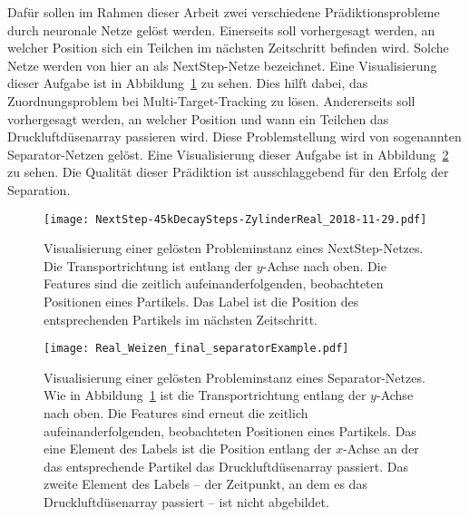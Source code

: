 Dafür sollen im Rahmen dieser Arbeit zwei verschiedene Prädiktionsprobleme durch neuronale Netze gelöst werden.
Einerseits soll vorhergesagt werden, an welcher Position sich ein Teilchen im nächsten Zeitschritt befinden wird.
Solche Netze werden von hier an als NextStep-Netze bezeichnet.
Eine Visualisierung dieser Aufgabe ist in Abbildung~\ref{fig:visualsNextstep} zu sehen.
Dies hilft dabei, das Zuordnungsproblem bei Multi-Target-Tracking zu lösen.
Andererseits soll vorhergesagt werden, an welcher Position und wann ein Teilchen das Druckluftdüsenarray passieren wird.
Diese Problemstellung wird von sogenannten Separator-Netzen gelöst.
Eine Visualisierung dieser Aufgabe ist in Abbildung~\ref{fig:visualsSeparator} zu sehen.
Die Qualität dieser Prädiktion ist ausschlaggebend für den Erfolg der Separation.


\begin{figure}[p]
    \centering
    \texttt{[image: NextStep-45kDecaySteps-ZylinderReal\_2018-11-29.pdf]}
    \caption[Visualisierung einer gelösten Probleminstanz eines NextStep-Netzes]{Visualisierung einer gelösten 
    Probleminstanz eines NextStep-Netzes. Die Transportrichtung ist entlang der \(y\)-Achse nach oben.
    Die Features sind die zeitlich aufeinanderfolgenden, beobachteten Positionen eines Partikels.
    Das Label ist die Position des entsprechenden Partikels im nächsten Zeitschritt.
    }
    \label{fig:visualsNextstep}
\end{figure}


\begin{figure}[p]
    \centering
	\texttt{[image: Real\_Weizen\_final\_separatorExample.pdf]}
    \caption[Visualisierung einer gelösten Probleminstanz eines Separator-Netzes]{Visualisierung einer gelösten Probleminstanz 
    eines Separator-Netzes.
    Wie in Abbildung~\ref{fig:visualsNextstep} ist die Transportrichtung entlang der \(y\)-Achse nach oben.
    Die Features sind erneut die zeitlich aufeinanderfolgenden, beobachteten Positionen eines Partikels.
    Das eine Element des Labels ist die Position entlang der \(x\)-Achse an der das entsprechende Partikel das Druckluftdüsenarray passiert.
    Das zweite Element des Labels -- der Zeitpunkt, an dem es das Druckluftdüsenarray passiert -- ist nicht abgebildet.
    }
	
	\label{fig:visualsSeparator}
\end{figure}



